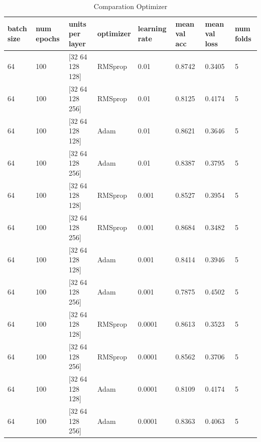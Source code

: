 \documentclass{book}
\begin{document}
            \begin{table}
                \begin{center}
                    \begin{tabular}{m{1cm}m{1cm}m{2.5cm}m{1.3cm}m{1cm}m{2cm}m{2cm}m{1cm}}
                        \midrule
                        batch size	& num epochs	& units per layer	& optimizer	& learning rate	& mean val acc	& mean val loss	& num folds \\
                        \midrule
                        64	& 100	& [32  64  128  128]	& RMSprop	& 0.01	& 0.8742 & 0.3405 & 5 \\
                        \midrule
                        64	& 100	& [32  64  128  256]	& RMSprop	& 0.01	& 0.8125 & 0.4174 & 5 \\
                        \midrule
                        64	& 100	& [32  64  128  128]	& Adam	& 0.01	& 0.8621 & 0.3646 & 5 \\
                        \midrule
                        64	& 100	& [32  64  128  256]	& Adam	& 0.01	& 0.8387 & 0.3795 & 5 \\
                        \midrule
                        64	& 100	& [32  64  128  128]	& RMSprop	& 0.001	& 0.8527 & 0.3954 & 5 \\
                        \midrule
                        64	& 100	& [32  64  128  256]	& RMSprop	& 0.001	& 0.8684 & 0.3482 & 5 \\
                        \midrule
                        64	& 100	& [32  64  128  128]	& Adam	& 0.001	& 0.8414 & 0.3946 & 5 \\
                        \midrule
                        64	& 100	& [32  64  128  256]	& Adam	& 0.001	& 0.7875 & 0.4502 & 5 \\
                        \midrule
                        64	& 100	& [32  64  128  128]	& RMSprop	& 0.0001	& 0.8613 & 0.3523 & 5 \\
                        \midrule
                        64	& 100	& [32  64  128  256]	& RMSprop	& 0.0001	& 0.8562 & 0.3706 & 5 \\
                        \midrule
                        64	& 100	& [32  64  128  128]	& Adam	& 0.0001	& 0.8109 & 0.4174 & 5 \\
                        \midrule
                        64	& 100	& [32  64  128  256]	& Adam	& 0.0001	& 0.8363 & 0.4063 & 5 \\
                        \midrule
                    \end{tabular}
                \end{center}
                \caption{\label{tab:optimizer}Comparation Optimizer}
            \end{table}
\end{document}
